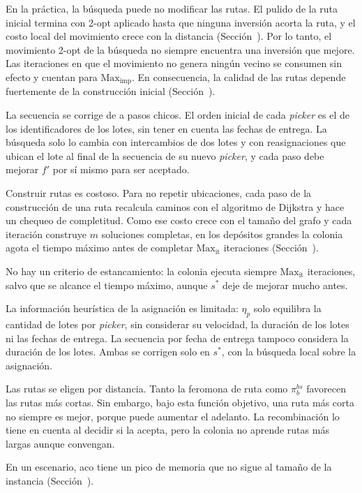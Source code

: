 \startitemize
	\item En la práctica, la búsqueda puede no modificar las rutas. El pulido
	de la ruta inicial termina con 2-opt aplicado hasta que ninguna inversión
	acorta la ruta, y el costo local del movimiento crece con la distancia
	(Sección~). Por lo tanto, el movimiento 2-opt de la búsqueda
	no siempre encuentra una inversión que mejore. Las iteraciones en que
	el movimiento no genera ningún vecino se consumen sin efecto y cuentan
	para $\text{Max}_{\text{imp}}$. En consecuencia, la calidad de las rutas
	depende fuertemente de la construcción inicial
	(Sección~).
	\item La secuencia se corrige de a pasos chicos. El orden inicial de
	cada {\em picker} es el de los identificadores de los lotes, sin tener en
	cuenta las fechas de entrega. La búsqueda solo lo cambia con intercambios
	de dos lotes y con reasignaciones que ubican el lote al final de la
	secuencia de su nuevo {\em picker}, y cada paso debe mejorar $f'$ por sí
	mismo para ser aceptado.
\stopitemize

\stopsubsubsection

\startsubsubsection[title={Propias de Ant Colony Optimization}, reference=sec:aco_limitaciones]

\startitemize
	\item Construir rutas es costoso. Para no repetir ubicaciones, cada
	paso de la construcción de una ruta recalcula caminos con el algoritmo de
	Dijkstra y hace un chequeo de completitud. Como ese costo crece con el
	tamaño del grafo y cada iteración construye $m$ soluciones completas, en
	los depósitos grandes la colonia agota el tiempo máximo antes de
	completar $\text{Max}_{\text{it}}$ iteraciones
	(Sección~).
	\item No hay un criterio de estancamiento: la colonia ejecuta siempre
	$\text{Max}_{\text{it}}$ iteraciones, salvo que se alcance el tiempo
	máximo, aunque $s^*$ deje de mejorar mucho antes.
	\item La información heurística de la asignación es limitada:
	$\eta_p$ solo equilibra la cantidad de lotes por {\em picker}, sin
	considerar su velocidad, la duración de los lotes ni las fechas de
	entrega. La secuencia por fecha de entrega tampoco considera la duración
	de los lotes. Ambas se corrigen solo en $s^*$, con la búsqueda local
	sobre la asignación.
	\item Las rutas se eligen por distancia. Tanto la feromona de ruta
	como $\pi^{bs}_b$ favorecen las rutas más cortas. Sin embargo, bajo esta función
	objetivo, una ruta más corta no siempre es mejor, porque puede aumentar
	el adelanto. La recombinación lo tiene en cuenta al decidir si la
	acepta, pero la colonia no aprende rutas más largas aunque convengan.
	\item En un escenario, \ac{aco} tiene un pico de
	memoria que no sigue al tamaño de la instancia
	(Sección~).
\stopitemize


